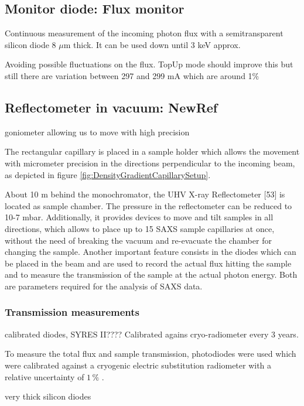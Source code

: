 \subsection{Monitor diode: Flux monitor}

Continuous measurement of the incoming photon flux with a semitransparent silicon diode 8 $\mu$m thick. It can be used down until 3 keV approx.

Avoiding possible fluctuations on the flux. TopUp mode should improve this but still there are variation between 297 and 299 mA which are around 1$\%$

\subsection{Reflectometer in vacuum: NewRef}

goniometer allowing us to move with high precision

The rectangular capillary is placed in a sample holder which allows the movement with micrometer precision in the directions perpendicular to the incoming beam, as depicted in figure \ref{fig:DensityGradientCapillarySetup}.

About 10 m behind the monochromator, the UHV X-ray Reflectometer [53] is located as sample chamber. The pressure in the reflectometer can be reduced to 10-7 mbar. Additionally, it provides devices to move and tilt samples in all directions, which allows to place up to 15 SAXS sample capillaries at once, without the need of breaking the vacuum and re-evacuate the chamber for changing the sample. Another important feature consists in the diodes which can be placed in the beam and are used to record the actual flux hitting the sample and to measure the transmission of the sample at the actual photon energy. Both are parameters required for the analysis of SAXS data.


\subsubsection{Transmission measurements}

calibrated diodes, SYRES II???? Calibrated agains cryo-radiometer every 3 years.

To measure the total flux and sample transmission, photodiodes were used which were calibrated against a cryogenic electric substitution radiometer with a relative uncertainty of \( 1\,\% \) \cite{krumrey_high-accuracy_2001}.

very thick silicon diodes

